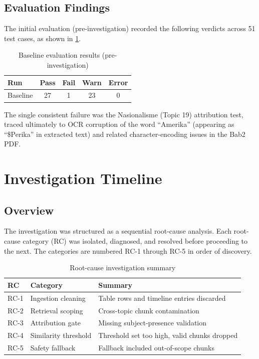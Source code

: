 \documentclass[12pt, a4paper]{report}
\begin{document}
\section{Evaluation Findings}

The initial evaluation (pre-investigation) recorded the following verdicts
across 51 test cases, as shown in \cref{tab:baseline_eval}.

\begin{table}[H]
  \centering
  \caption{Baseline evaluation results (pre-investigation)}
  \label{tab:baseline_eval}
  \begin{tabular}{lcccc}
    \toprule
    \textbf{Run} & \textbf{Pass} & \textbf{Fail} & \textbf{Warn} & \textbf{Error} \\
    \midrule
    Baseline & 27 & 1 & 23 & 0 \\
    \bottomrule
  \end{tabular}
\end{table}

The single consistent failure was the Nasionalisme (Topic 19) attribution test,
traced ultimately to OCR corruption of the word ``Amerika'' (appearing as
``\$Perika'' in extracted text) and related character-encoding issues in the
Bab2 PDF.


\chapter{Investigation Timeline}

\section{Overview}

The investigation was structured as a sequential root-cause analysis. Each
root-cause category (RC) was isolated, diagnosed, and resolved before
proceeding to the next. The categories are numbered RC-1 through RC-5 in order
of discovery.

\begin{table}[H]
  \centering
  \caption{Root-cause investigation summary}
  \label{tab:rc_summary}
  \begin{tabularx}{\textwidth}{llX}
    \toprule
    \textbf{RC} & \textbf{Category} & \textbf{Summary} \\
    \midrule
    RC-1 & Ingestion cleaning & Table rows and timeline entries discarded \\
    RC-2 & Retrieval scoping & Cross-topic chunk contamination \\
    RC-3 & Attribution gate & Missing subject-presence validation \\
    RC-4 & Similarity threshold & Threshold set too high, valid chunks dropped \\
    RC-5 & Safety fallback & Fallback included out-of-scope chunks \\
    \bottomrule
  \end{tabularx}
\end{table}
\end{document}
